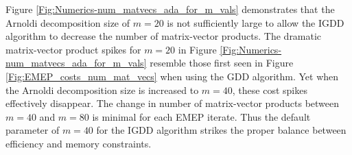 Figure \ref{Fig:Numerics-num_matvecs_ada_for_m_vals} demonstrates that the Arnoldi decomposition size of $m=20$ is not sufficiently large to allow the IGDD algorithm to decrease the number of matrix-vector products.  
The dramatic matrix-vector product spikes for $m=20$ in Figure \ref{Fig:Numerics-num_matvecs_ada_for_m_vals} resemble those first seen in Figure \ref{Fig:EMEP_costs_num_mat_vecs} when using the GDD algorithm.
Yet when the Arnoldi decomposition size is increased to $m=40$, these cost spikes effectively disappear.
The change in number of matrix-vector products between $m=40$ and $m=80$ is minimal for each EMEP iterate.  
Thus the default parameter of $m=40$ for the IGDD algorithm strikes the proper balance between efficiency and memory constraints.













